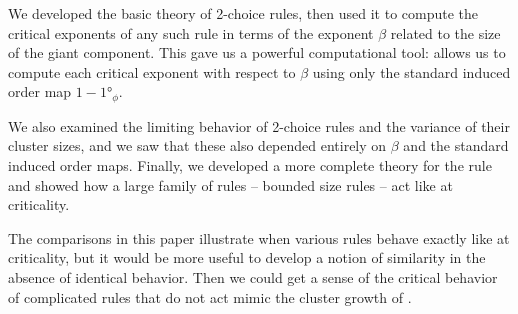 \documentclass[twoside,10pt]{article}
\begin{document}
We developed the basic theory of 2-choice rules, then used it to compute the critical exponents of any such rule in terms of the exponent $\beta$ related to the size of the giant component. This gave us a powerful computational tool:  allows us to compute each critical exponent with respect to $\beta$ using only the standard induced order map $1 - \ang{1}_{\phi}$.

We also examined the limiting behavior of 2-choice rules and the variance of their cluster sizes, and we saw that these also depended entirely on $\beta$ and the standard induced order maps. Finally, we developed a more complete theory for the \ER rule and showed how a large family of rules -- bounded size rules -- act like \ER at criticality.

The \ER comparisons in this paper illustrate when various rules behave exactly like \ER at criticality, but it would be more useful to develop a notion of similarity in the absence of identical behavior. Then we could get a sense of the critical behavior of complicated rules that do not act mimic the cluster growth of \ER.


\printbibliography
\end{document}
